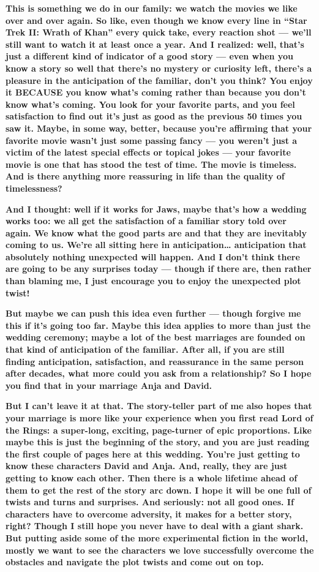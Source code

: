\textbf{This is something we do in our family: we watch the movies we
like over and over again. So like, even though we know every line in
``Star Trek II: Wrath of Khan'' every quick take, every reaction shot
--- we'll still want to watch it at least once a year. And I realized:
well, that's just a different kind of indicator of a good story --- even
when you know a story so well that there's no mystery or curiosity left,
there's a pleasure in the anticipation of the familiar, don't you think?
You enjoy it BECAUSE you know what's coming rather than because you
don't know what's coming. You look for your favorite parts, and you feel
satisfaction to find out it's just as good as the previous 50 times you
saw it. Maybe, in some way, better, because you're affirming that your
favorite movie wasn't just some passing fancy --- you weren't just a
victim of the latest special effects or topical jokes --- your favorite
movie is one that has stood the test of time. The movie is timeless. And
is there anything more reassuring in life than the quality of
timelessness?}

\textbf{And I thought: well if it works for Jaws, maybe that's how a
wedding works too: we all get the satisfaction of a familiar story told
over again. We know what the good parts are and that they are inevitably
coming to us. We're all sitting here in anticipation\ldots{}
anticipation that absolutely nothing unexpected will happen. And I don't
think there are going to be any surprises today --- though if there are,
then rather than blaming me, I just encourage you to enjoy the
unexpected plot twist!}

\textbf{But maybe we can push this idea even further --- though forgive
me this if it's going too far. Maybe this idea applies to more than just
the wedding ceremony; maybe a lot of the best marriages are founded on
that kind of anticipation of the familiar. After all, if you are still
finding anticipation, satisfaction, and reassurance in the same person
after decades, what more could you ask from a relationship? So I hope
you find that in your marriage Anja and David.}

\textbf{But I can't leave it at that. The story-teller part of me also
hopes that your marriage is more like your experience when you first
read Lord of the Rings: a super-long, exciting, page-turner of epic
proportions. Like maybe this is just the beginning of the story, and you
are just reading the first couple of pages here at this wedding. You're
just getting to know these characters David and Anja. And, really, they
are just getting to know each other. Then there is a whole lifetime
ahead of them to get the rest of the story arc down. I hope it will be
one full of twists and turns and surprises. And seriously: not all good
ones. If characters have to overcome adversity, it makes for a better
story, right? Though I still hope you never have to deal with a giant
shark. But putting aside some of the more experimental fiction in the
world, mostly we want to see the characters we love successfully
overcome the obstacles and navigate the plot twists and come out on
top.}

